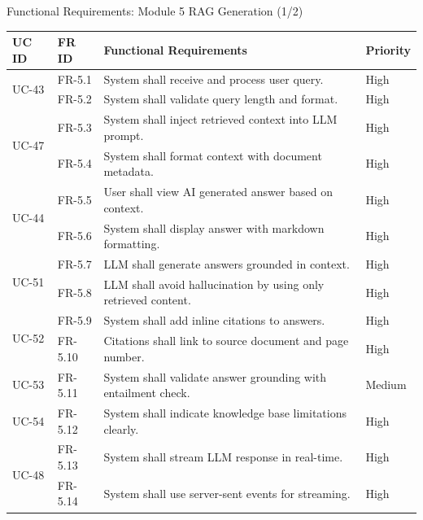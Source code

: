 \documentclass[aspectratio=169,xcolor=dvipsnames]{beamer}
\begin{document}
\begin{frame}{Functional Requirements: Module 5 RAG Generation (1/2)}
    \tiny
    \renewcommand{\arraystretch}{0.63}
    \begin{table}
        \centering
        \begin{tabular}{p{}|p{}|p{}|p{}}
        \toprule
        \textbf{UC ID} & \textbf{FR ID} & \textbf{Functional Requirements} & \textbf{Priority} \\
        \midrule
        \multirow{2}{*}{UC-43} & FR-5.1 & System shall receive and process user query. & High \\
        & FR-5.2 & System shall validate query length and format. & High \\
        \midrule
        \multirow{2}{*}{UC-47} & FR-5.3 & System shall inject retrieved context into LLM prompt. & High \\
        & FR-5.4 & System shall format context with document metadata. & High \\
        \midrule
        \multirow{2}{*}{UC-44} & FR-5.5 & User shall view AI generated answer based on context. & High \\
        & FR-5.6 & System shall display answer with markdown formatting. & High \\
        \midrule
        \multirow{2}{*}{UC-51} & FR-5.7 & LLM shall generate answers grounded in context. & High \\
        & FR-5.8 & LLM shall avoid hallucination by using only retrieved content. & High \\
        \midrule
        \multirow{2}{*}{UC-52} & FR-5.9 & System shall add inline citations to answers. & High \\
        & FR-5.10 & Citations shall link to source document and page number. & High \\
        \midrule
        UC-53 & FR-5.11 & System shall validate answer grounding with entailment check. & Medium \\
        \midrule
        UC-54 & FR-5.12 & System shall indicate knowledge base limitations clearly. & High \\
        \midrule
        \multirow{2}{*}{UC-48} & FR-5.13 & System shall stream LLM response in real-time. & High \\
        & FR-5.14 & System shall use server-sent events for streaming. & High \\
        \bottomrule
        \end{tabular}
    \end{table}
\end{frame}
\end{document}

